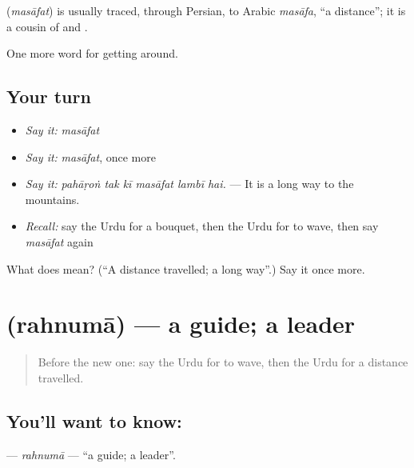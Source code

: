 \begin{cousinweb}
\textbf{} (\emph{masāfat}) is usually traced, through Persian, to Arabic \emph{masāfa}, \textquotedblleft{}a distance\textquotedblright{}; it is a cousin of \textbf{} and \textbf{}.
\end{cousinweb}

\begin{grammarlens}[title={What you've built}]
One more word for getting around.
\end{grammarlens}

\subsection*{Your turn}
\begin{itemize}
\raggedright
  \item \emph{Say it:} \emph{masāfat}
  \item \emph{Say it:} \emph{masāfat}, once more
  \item \emph{Say it:} \emph{pahāṛoṅ tak kī masāfat lambī hai.} — It is a long way to the mountains.
  \item \emph{Recall:} say the Urdu for a bouquet, then the Urdu for to wave, then say \emph{masāfat} again
\end{itemize}

\begin{tcolorbox}[breakable,colback=teal!4,colframe=teal!35!black,title={Before you move on}]
What does  mean? (\textquotedblleft{}A distance travelled; a long way\textquotedblright{}.) Say it once more.
\end{tcolorbox}
\section[\texorpdfstring{\ur{رہنما} (rahnumā)}{رہنما (rahnumā)}]{ (rahnumā) — a guide; a leader}

\label{lesson:UR-C402-rahnuma}



\begin{quote}
Before the new one: say the Urdu for to wave, then the Urdu for a distance travelled.
\end{quote}

\subsection*{You'll want to know: }
\textbf{} — \emph{rahnumā} — \textquotedblleft{}a guide; a leader\textquotedblright{}.

